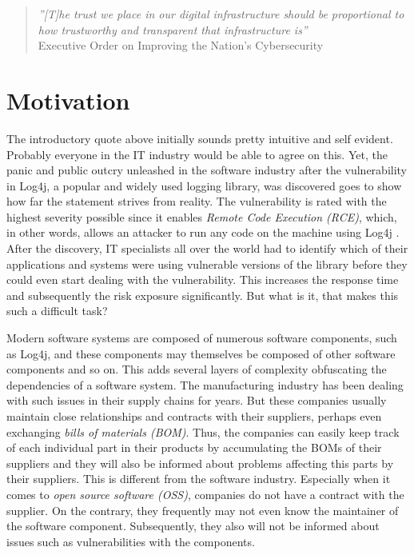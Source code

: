 
\pagestyle{fancy-style}

\begin{quote}
	\emph{''[T]he trust we place in our digital infrastructure should be proportional to how trustworthy and transparent that infrastructure is''}\\
	Executive Order on Improving the Nation's Cybersecurity \cite{ExecutiveOrderSBOM}
\end{quote}

\section{Motivation}
The introductory quote above initially sounds pretty intuitive and self evident. Probably everyone in the IT industry would be able to agree on this. Yet, the panic and public outcry unleashed in the software industry after the vulnerability in Log4j, a popular and widely used logging library, was discovered goes to show how far the statement strives from reality. The vulnerability is rated with the highest severity possible since it enables \textit{Remote Code Execution (RCE)}, which, in other words, allows an attacker to run any code on the machine using Log4j \cite{Log4jVuln}. After the discovery, IT specialists all over the world had to identify which of their applications and systems were using vulnerable versions of the library before they could even start dealing with the vulnerability. This increases the response time and subsequently the risk exposure significantly. But what is it, that makes this such a difficult task?\par
Modern software systems are composed of numerous software components, such as Log4j, and these components may themselves be composed of other software components and so on. This adds several layers of complexity obfuscating the dependencies of a software system. The manufacturing industry has been dealing with such issues in their supply chains for years. But these companies usually maintain close relationships and contracts with their suppliers, perhaps even exchanging \textit{bills of materials (BOM)}. Thus, the companies can easily keep track of each individual part in their products by accumulating the BOMs of their suppliers and they will also be informed about problems affecting this parts by their suppliers. This is different from the software industry. Especially when it comes to \textit{open source software (OSS)}, companies do not have a contract with the supplier. On the contrary, they frequently may not even know the maintainer of the software component. Subsequently, they also will not be informed about issues such as vulnerabilities with the components.\par

